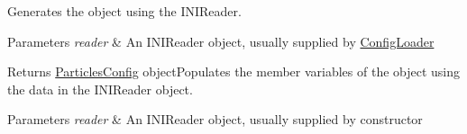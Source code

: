 Generates the object using the I\+N\+I\+Reader. 


\begin{DoxyParams}{Parameters}
{\em reader} & An I\+N\+I\+Reader object, usually supplied by \hyperlink{classConfigLoader}{Config\+Loader} \\
\hline
\end{DoxyParams}
\begin{DoxyReturn}{Returns}
\hyperlink{classParticlesConfig}{Particles\+Config} object\+Populates the member variables of the object using the data in the I\+N\+I\+Reader object. 
\end{DoxyReturn}

\begin{DoxyParams}{Parameters}
{\em reader} & An I\+N\+I\+Reader object, usually supplied by constructor \\
\hline
\end{DoxyParams}


